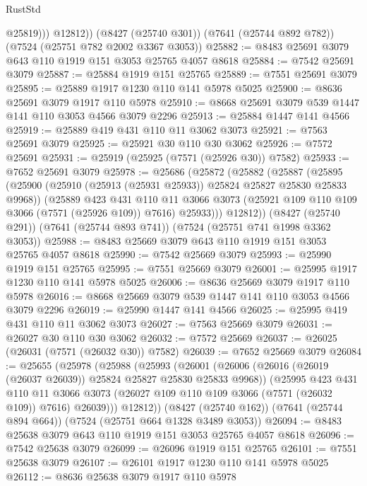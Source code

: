 \begin{lexlean}{RustStd}
\begin{coremodule}
{\begin{coremodule}
{{{{{{{{{{{{{{{{{{{{{{{{{{{{{{{{              @25819)))
        @12812))
    (@8427 (@25740 @301))
    (@7641 (@25744 @892 @782))
    (@7524 (@25751 @782 @2002 @3367 @3053))
@25882 := @8483 @25691 @3079 @643 @110 @1919 @151 @3053 @25765 @4057 @8618
@25884 := @7542 @25691 @3079
@25887 := @25884 @1919 @151 @25765
@25889 := @7551 @25691 @3079
@25895 := @25889 @1917 @1230 @110 @141 @5978 @5025
@25900 := @8636 @25691 @3079 @1917 @110 @5978
@25910 := @8668 @25691 @3079 @539 @1447 @141 @110 @3053 @4566 @3079 @2296
@25913 := @25884 @1447 @141 @4566
@25919 := @25889 @419 @431 @110 @11 @3062 @3073
@25921 := @7563 @25691 @3079
@25925 := @25921 @30 @110 @30 @3062
@25926 := @7572 @25691
@25931 := @25919 (@25925 (@7571 (@25926 @30)) @7582)
@25933 := @7652 @25691 @3079
@25978 := @25686
    (@25872
      (@25882
        (@25887
          (@25895
            (@25900 (@25910 (@25913 (@25931 @25933)) @25824 @25827 @25830 @25833 @9968))
            (@25889
              @423
              @431
              @110
              @11
              @3066
              @3073
              (@25921 @109 @110 @109 @3066 (@7571 (@25926 @109)) @7616)
              @25933)))
        @12812))
    (@8427 (@25740 @291))
    (@7641 (@25744 @893 @741))
    (@7524 (@25751 @741 @1998 @3362 @3053))
@25988 := @8483 @25669 @3079 @643 @110 @1919 @151 @3053 @25765 @4057 @8618
@25990 := @7542 @25669 @3079
@25993 := @25990 @1919 @151 @25765
@25995 := @7551 @25669 @3079
@26001 := @25995 @1917 @1230 @110 @141 @5978 @5025
@26006 := @8636 @25669 @3079 @1917 @110 @5978
@26016 := @8668 @25669 @3079 @539 @1447 @141 @110 @3053 @4566 @3079 @2296
@26019 := @25990 @1447 @141 @4566
@26025 := @25995 @419 @431 @110 @11 @3062 @3073
@26027 := @7563 @25669 @3079
@26031 := @26027 @30 @110 @30 @3062
@26032 := @7572 @25669
@26037 := @26025 (@26031 (@7571 (@26032 @30)) @7582)
@26039 := @7652 @25669 @3079
@26084 := @25655
    (@25978
      (@25988
        (@25993
          (@26001
            (@26006 (@26016 (@26019 (@26037 @26039)) @25824 @25827 @25830 @25833 @9968))
            (@25995
              @423
              @431
              @110
              @11
              @3066
              @3073
              (@26027 @109 @110 @109 @3066 (@7571 (@26032 @109)) @7616)
              @26039)))
        @12812))
    (@8427 (@25740 @162))
    (@7641 (@25744 @894 @664))
    (@7524 (@25751 @664 @1328 @3489 @3053))
@26094 := @8483 @25638 @3079 @643 @110 @1919 @151 @3053 @25765 @4057 @8618
@26096 := @7542 @25638 @3079
@26099 := @26096 @1919 @151 @25765
@26101 := @7551 @25638 @3079
@26107 := @26101 @1917 @1230 @110 @141 @5978 @5025
@26112 := @8636 @25638 @3079 @1917 @110 @5978
}}}}}}}}}}}}}}}}}}}}}}}}}}}}}}}}
\end{coremodule}}
\end{coremodule}
\end{lexlean}
